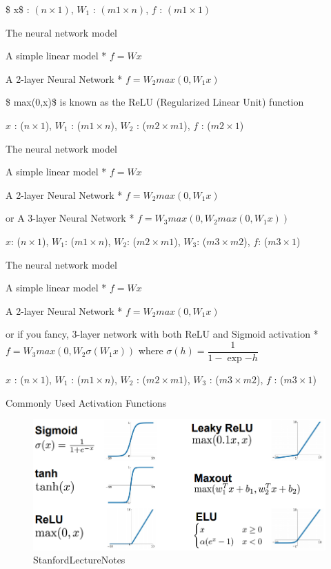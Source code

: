 \documentclass[11pt]{article}
\makeatletter
\def\maxwidth{\ifdim\Gin@nat@width>\linewidth\linewidth
    \else\Gin@nat@width\fi}
\let\Oldincludegraphics\includegraphics
\renewcommand{\includegraphics}[1]{\Oldincludegraphics[width=.8\maxwidth]{#1}}
\makeatother
\begin{document}
\$ x\$ : \((n \times 1)\), \(W_1\) : \((m1 \times n)\), \(f\) :
\((m1 \times 1)\)

    The neural network model

A simple linear model * \(f = Wx\)

A 2-layer Neural Network * \(f = W_2 max(0, W_1x)\)

\$ max(0,x)\$ is known as the ReLU (Regularized Linear Unit) function

\(x\) : (\(n \times 1\)), \(W_1\) : (\(m1 \times n\)), \(W_2\) :
(\(m2 \times m1\)), \(f\) : (\(m2 \times 1\))

    The neural network model

A simple linear model * \(f = Wx\)

A 2-layer Neural Network * \(f = W_2 max(0, W_1x)\)

or A 3-layer Neural Network * \(f = W_3max(0, W_2 max(0, W_1x))\)

\(x\): (\(n \times 1\)), \(W_1\): (\(m1 \times n\)), \(W_2\):
(\(m2 \times m1\)), \(W_3\): (\(m3 \times m2\)), \(f\):
(\(m3 \times 1\))

    The neural network model

A simple linear model * \(f = Wx\)

A 2-layer Neural Network * \(f = W_2 max(0, W_1x)\)

or if you fancy, 3-layer network with both ReLU and Sigmoid activation *
\(f = W_3max(0, W_2 \sigma(W_1x))\) where
\(\sigma(h) = \dfrac{1}{1 - \exp{-h}}\)

\(x\) : (\(n \times 1\)), \(W_1\) : (\(m1 \times n\)), \(W_2\) :
(\(m2 \times m1\)), \(W_3\) : (\(m3 \times m2\)), \(f\) :
(\(m3 \times 1\))

    Commonly Used Activation Functions

\begin{figure}
\centering
\includegraphics{pres_imgs/activation_functions.png}
\caption{StanfordLectureNotes}
\end{figure}
\end{document}
